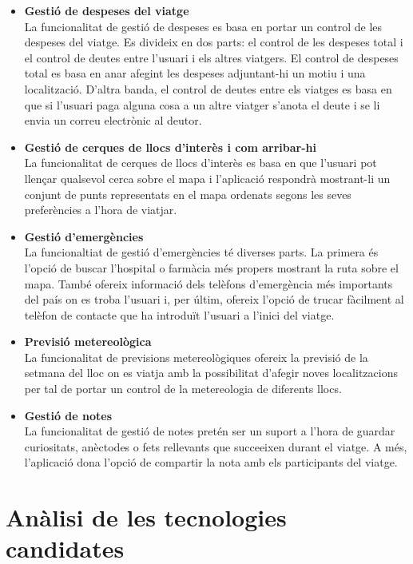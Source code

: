 \begin{itemize}

\item{}\textbf{Gestió de despeses del viatge}\\
La funcionalitat de gestió de despeses es basa en portar un control de les
despeses del viatge. Es divideix en dos parts: el control de les despeses
total i el control de deutes entre l’usuari i els altres viatgers. El control de despeses total es basa en anar afegint les despeses adjuntant-hi un motiu i una localització. D’altra banda, el control de deutes entre els viatges es basa en que si l’usuari paga alguna cosa a un altre viatger s’anota el deute i se li envia un correu electrònic al deutor.
\item{}\textbf{Gestió de cerques de llocs d’interès i com arribar-hi}\\
La funcionalitat de cerques de llocs d’interès es basa en que l’usuari pot
llençar qualsevol cerca sobre el mapa i l’aplicació respondrà mostrant-li
un conjunt de punts representats en el mapa ordenats segons les seves
preferències a l’hora de viatjar.
\item{}\textbf{Gestió d’emergències}\\
La funcionaltiat de gestió d’emergències té diverses parts. La primera és
l’opció de buscar l’hospital o farmàcia més propers mostrant la ruta sobre
el mapa. També ofereix informació dels telèfons d’emergència més importants del país on es troba l’usuari i, per últim, ofereix l’opció de trucar
fàcilment al telèfon de contacte que ha introduït l’usuari a l’inici del viatge.
\item{}\textbf{Previsió metereològica}\\
La funcionalitat de previsions metereològiques ofereix la previsió de la
setmana del lloc on es viatja amb la possibilitat d’afegir noves localitzacions per tal de portar un control de la metereologia de diferents llocs.
\item{}\textbf{Gestió de notes}\\
La funcionalitat de gestió de notes pretén ser un suport a l’hora de guardar curiositats, anèctodes o fets rellevants que succeeixen durant el viatge.
A més, l’aplicació dona l’opció de compartir la nota amb els participants del viatge.

\end{itemize}

\section{Anàlisi de les tecnologies candidates}

